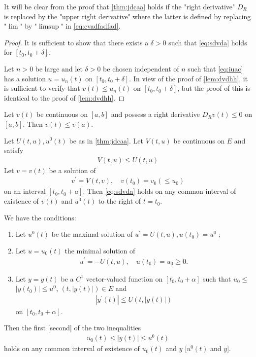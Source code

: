 \documentclass{article}
\begin{document}
\begin{rema}
It will be clear from the proof that \cref{thm:jdcaa} holds if the "right derivative" $D_{R}$ is replaced by the "upper right derivative" where the latter is defined by replacing "$\lim$" by "$\limsup$" in \cref{eq:cvadfadfad}.
\end{rema} 
\begin{proof}
It is sufficient to show that there exists a $\delta>0$ such that \cref{eq:sdvda} holds for $\left[t_{0}, t_{0}+\delta\right]$. 

Let $n>0$ be large and let $\delta>0$ be chosen independent of $n$ such that \cref{eq:iuac} has a solution $u=u_{n}(t)$ on $\left[t_{0}, t_{0}+\delta\right]$. In view of the proof of \cref{lem:dvdhh}, it is sufficient to verify that $v(t) \leq u_{n}(t)$ on $\left[t_{0}, t_{0}+\delta\right]$, but the proof of this is identical to the proof of \cref{lem:dvdhh}.
\end{proof} 
\begin{cora}
Let $v(t)$ be continuous on $[a, b]$ and possess a right derivative $D_{R} v(t) \leq 0$ on $[a, b]$. Then $v(t) \leq v(a)$.
\end{cora} 
\begin{cora}
Let $U(t, u), u^{0}(t)$ be as in \cref{thm:jdcaa}. Let $V(t, u)$ be continuous on $E$ and satisfy
\begin{align}
V(t, u) \leq U(t, u)\label{eq:jcad}
\end{align}
Let $v=v(t)$ be a solution of
\begin{align}
v^{\prime}=V(t, v), \quad v\left(t_{0}\right)=v_{0}\left(\leq u_{0}\right)\label{eq:dzcv}
\end{align}
on an interval $\left[t_{0}, t_{0}+a\right] .$ Then \cref{eq:sdvda} holds on any common interval of existence of $v(t)$ and $u^{0}(t)$ to the right of $t=t_{0}$.
\end{cora} 
\begin{cora}\label{cor:cfvad}We have the conditions:
\begin{enumerate}
    \item Let $u^{0}(t)$ be the maximal solution of $u^{\prime}=U(t, u), u\left(t_{0}\right)=u^0$ ; 
\item Let $u=u_{0}(t)$ the minimal solution of
\begin{align*}
u^{\prime}=-U(t, u), \quad u\left(t_{0}\right)=u_{0}\geq 0.
\end{align*}
\item Let $y=y(t)$ be a $C^{1}$ vector-valued function on $\left[t_{0}, t_{0}+\alpha\right]$ such that $u_{0} \leq$ $\left|y\left(t_{0}\right)\right| \leq u^{0}$, $(t,|y(t)|) \in E$ and
\begin{align}
\left|y^{\prime}(t)\right| \leq U(t,|y(t)|)\label{eq:kdsnc}
\end{align}
on $\left[t_{0}, t_{0}+\alpha\right]$.
\end{enumerate}
 Then the first [second] of the two inequalities
\begin{align}
u_{0}(t) \leq|y(t)| \leq u^{0}(t)\label{eq:czdfad}
\end{align}
holds on any common interval of existence of $u_{0}(t)$ and $y$ [$u^{0}(t)$ and $y$].
\end{cora} 
\end{document}
